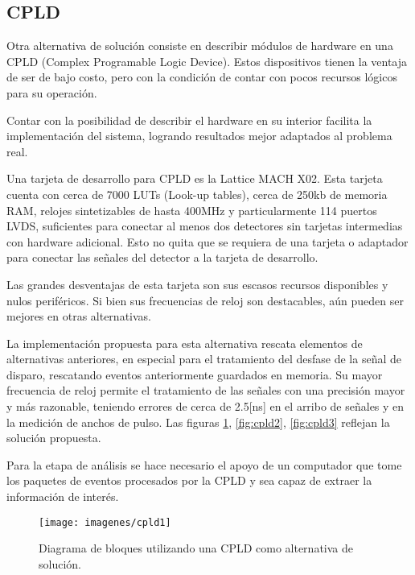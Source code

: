\newpage
\subsection{CPLD}
\par Otra alternativa de solución consiste en describir módulos de hardware en una CPLD (Complex Programable Logic Device). Estos dispositivos tienen la ventaja de ser de bajo costo, pero con la condición de contar con pocos recursos lógicos para su operación.
\par Contar con la posibilidad de describir el hardware en su interior facilita la implementación del sistema, logrando resultados mejor adaptados al problema real.
\par Una tarjeta de desarrollo para CPLD es la Lattice MACH X02\cite{Semiconductor2017DS1035Sheet}. Esta tarjeta cuenta con cerca de 7000 LUTs (Look-up tables), cerca de 250kb de memoria RAM, relojes sintetizables de hasta 400MHz y particularmente 114 puertos LVDS, suficientes para conectar al menos dos detectores sin tarjetas intermedias con hardware adicional. Esto no quita que se requiera de una tarjeta o adaptador para conectar las señales del detector a la tarjeta de desarrollo.

\par Las grandes desventajas de esta tarjeta son sus escasos recursos disponibles y nulos periféricos. Si bien sus frecuencias de reloj son destacables, aún pueden ser mejores en otras alternativas.

\par La implementación propuesta para esta alternativa rescata elementos de alternativas anteriores, en especial para el tratamiento del desfase de la señal de disparo, rescatando eventos anteriormente guardados en memoria. Su mayor frecuencia de reloj permite el tratamiento de las señales con una precisión mayor y más razonable, teniendo errores de cerca de 2.5[ns] en el arribo de señales y en la medición de anchos de pulso. Las figuras \ref{fig:cpld1}, \ref{fig:cpld2}, \ref{fig:cpld3} reflejan la solución propuesta.

\par Para la etapa de análisis se hace necesario el apoyo de un computador que tome los paquetes de eventos procesados por la CPLD y sea capaz de extraer la información de interés.

\begin{figure}[H]
	\centering
	\texttt{[image: imagenes/cpld1]}
	\caption{Diagrama de bloques utilizando una CPLD como alternativa de solución.}
	\label{fig:cpld1}
\end{figure}



